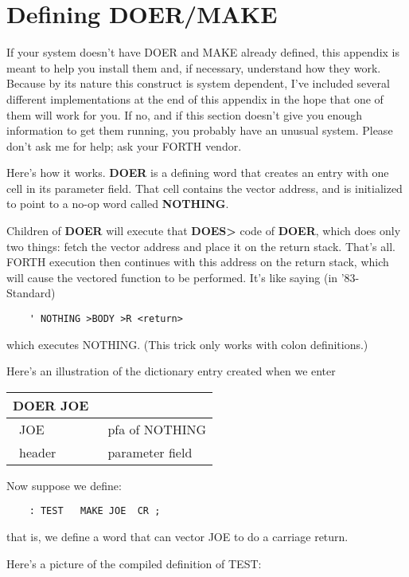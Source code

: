 \chapter{Defining
DOER/MAKE}
If your system doesn't have DOER and MAKE
already defined, this appendix
is meant to help you install them and, if necessary, understand
how they work.  Because by its nature this construct is system
dependent, I've included several different implementations at the end of
this appendix in the hope that one of them will work for you.  If no, and if
this section doesn't give you enough information to get them running,
you probably have an unusual system.  Please don't ask me for help; ask
your FORTH vendor.

Here's how it works.  {\bf DOER} is a defining word that creates an entry
with one cell in its parameter field. That cell contains the vector address,
and is initialized to point to a no-op word called {\bf NOTHING}.

Children of {\bf DOER} will execute that {\bf DOES> } code of {\bf DOER}, which
does only two things:  fetch the vector address and place it on the return
stack.  That's all.  FORTH execution then continues with this address on
the return stack, which will cause the vectored function to be performed.
It's like saying (in '83-Standard)
\begin{verbatim}
    ' NOTHING >BODY >R <return>
\end{verbatim}
which executes NOTHING.  (This trick only works with colon definitions.)

Here's an illustration of the dictionary entry created when we enter


{\sf
\bigskip
\begin{tabular}{@{} l l@{}}
DOER JOE & \\
\hline
\vline\ JOE & \vline\ pfa of NOTHING \vline \\
\hline
\ header &\  parameter field
\end{tabular}
\bigskip
}


Now suppose we define:
\begin{verbatim}
    : TEST   MAKE JOE  CR ;
\end{verbatim}
that is, we define a word that can vector JOE to do a carriage return.

Here's a picture of the compiled definition of TEST:  \\

